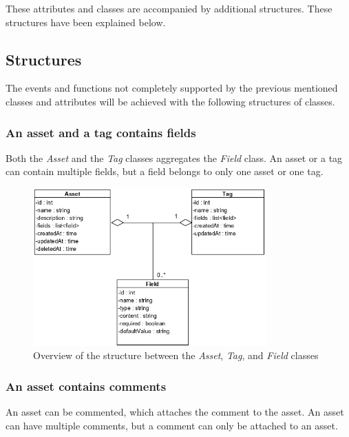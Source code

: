 These attributes and classes are accompanied by additional structures. These structures have been explained below.

\subsection{Structures}
The events and functions not completely supported by the previous mentioned classes and attributes will be achieved with the following structures of classes.

\subsubsection{An asset and a tag contains fields}
Both the \textit{Asset} and the \textit{Tag} classes aggregates the \textit{Field} class. An asset or a tag can contain multiple fields, but a field belongs to only one asset or one tag.

\begin{figure}[H]
    \centering
    \includegraphics[width=0.8\textwidth]{figures/Structures/AssetTagFieldStructure.png}
    \caption{Overview of the structure between the \textit{Asset}, \textit{Tag}, and \textit{Field} classes}
    \label{fig:AssetTagFieldStructure}
\end{figure}

\subsubsection{An asset contains comments}
An asset can be commented, which attaches the comment to the asset. An asset can have multiple comments, but a comment can only be attached to an asset.

